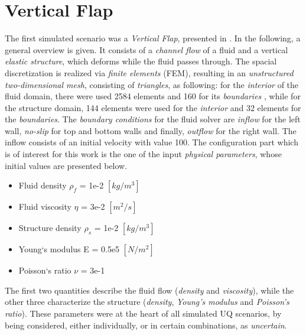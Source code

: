 \section{Vertical Flap}
\label{sec:Vertical Flap}
	The first simulated scenario was a \emph{Vertical Flap}, presented in . In the following, a general overview is given. It consists of a \emph{channel flow} of a fluid and a vertical \emph{elastic structure}, which deforms while the fluid passes through. The spacial discretization is realized via \emph{finite elements} (FEM), resulting in an \emph{unstructured two-dimensional mesh}, consisting of \emph{triangles}, as following: for the \emph{interior} of the fluid domain, there were used 2584 elements and 160 for its \emph{boundaries }, while for the structure domain, 144 elements were used for the \emph{interior} and 32 elements for the \emph{boundaries}.
\newline
	The \emph{boundary conditions} for the fluid solver are \emph{inflow} for the left wall, \emph{no-slip} for top and bottom walls and finally, \emph{outflow} for the right wall. The inflow consists of an initial velocity with value 100. The configuration part which is of interest for this work is the one of the input \emph{physical parameters}, whose initial values are presented below.
\begin{itemize}
\item Fluid density $\rho_f$ = 1e-2 $[kg/m^3]$
\item Fluid viscosity $\eta$ = 3e-2 $[m^2/s]$
\item Structure density $\rho_s$ = 1e-2 $[kg/m^3]$
\item Young`s modulus E = 0.5e5 $[N/m^2]$
\item Poisson`s ratio $\nu$ = 3e-1
\end{itemize}
The first two quantities describe the fluid flow (\emph{density} and \emph{viscosity}), while the other three characterize the structure (\emph{density}, \emph{Young's modulus} and \emph{Poisson's ratio}).	These parameters were at the heart of all simulated UQ scenarios, by being considered, either individually, or in certain combinations, as \emph{uncertain}.
